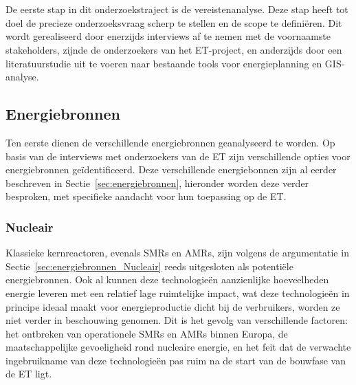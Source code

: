 
\chapter{}%
\label{ch:vereistenanalyse}

De eerste stap in dit onderzoekstraject is de vereistenanalyse. Deze stap heeft tot doel de precieze onderzoeksvraag scherp te stellen en de scope te definiëren. Dit wordt gerealiseerd door enerzijds interviews af te nemen met de voornaamste stakeholders, zijnde de onderzoekers van het ET-project, en anderzijds door een literatuurstudie uit te voeren naar bestaande tools voor energieplanning en GIS-analyse.

\section{Energiebronnen}
Ten eerste dienen de verschillende energiebronnen geanalyseerd te worden. Op basis van de interviews met onderzoekers van de ET zijn verschillende opties voor energiebronnen geïdentificeerd. Deze verschillende energiebonnen zijn al eerder beschreven in Sectie~\ref{sec:energiebronnen}, hieronder worden deze verder besproken, met specifieke aandacht voor hun toepassing op de ET.\@

\subsection{Nucleair}
Klassieke kernreactoren, evenals SMRs en AMRs, zijn volgens de argumentatie in Sectie~\ref{sec:energiebronnen_Nucleair} reeds uitgesloten als potentiële energiebronnen. Ook al kunnen deze technologieën aanzienlijke hoeveelheden energie leveren met een relatief lage ruimtelijke impact, wat deze technologieën in principe ideaal maakt voor energieproductie dicht bij de verbruikers, worden ze niet verder in beschouwing genomen. Dit is het gevolg van verschillende factoren: het ontbreken van operationele SMRs en AMRs binnen Europa, de maatschappelijke gevoeligheid rond nucleaire energie, en het feit dat de verwachte ingebruikname van deze technologieën pas ruim na de start van de bouwfase van de ET ligt.


